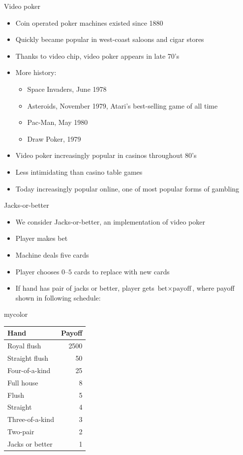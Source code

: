 \documentclass[xcolor=dvipsnames]{beamer}
\theoremstyle{definition}
\begin{document}
\begin{frame}{Video poker}
\begin{itemize}
\item Coin operated poker machines existed since 1880
\item Quickly became popular in west-coast
saloons and cigar stores
\item Thanks to video chip, video poker appears in late 70's
\item More history:
\begin{itemize}
\item \alert{Space Invaders}, June 1978
\item \alert{Asteroids}, November 1979, Atari's best-selling game of all time
\item \alert{Pac-Man}, May 1980
\item \alert{Draw Poker}, 1979
\end{itemize}
\item Video poker increasingly popular in casinos
throughout 80's
\item Less intimidating than casino table games
\item Today increasingly popular online, one of most popular
forms of gambling
\end{itemize}
\end{frame}

\begin{frame}{Jacks-or-better}
\begin{multicols}{2}
\begin{itemize}
\item We consider \alert{Jacks-or-better},
an implementation of video poker
\item Player makes bet
\item Machine deals five cards
\item Player chooses $0$--$5$ cards to replace with new cards
\item If hand has pair of jacks or better,
player gets $\text{bet}\times\text{payoff}$,
where payoff shown in
following schedule:
\end{itemize}
\begin{beamercolorbox}{mycolor}
\begin{tabular}{lr}
Hand&Payoff\\\hline
Royal flush&2500\\
Straight flush&50\\
Four-of-a-kind&25\\
Full house&8\\
Flush&5\\
Straight&4\\
Three-of-a-kind&3\\
Two-pair&2\\
Jacks or better&1
\end{tabular}
\end{beamercolorbox}
\end{multicols}
\end{frame}
\end{document}
